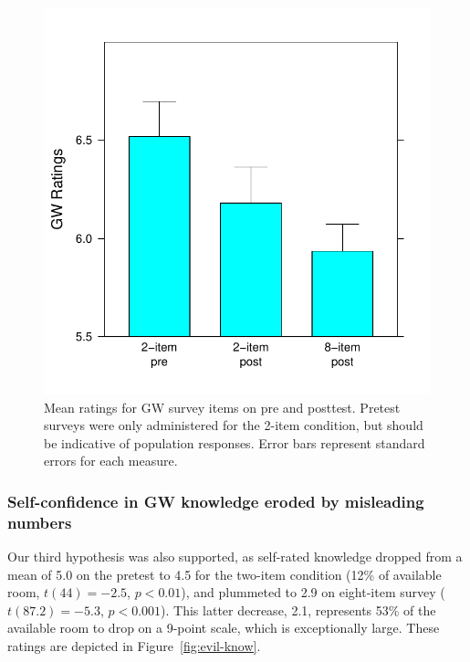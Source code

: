 \begin{figure}
    \centering
    \includegraphics{evil-GW.pdf}
    \caption{Mean ratings for GW survey items on pre and posttest. Pretest
        surveys were only administered for the 2-item condition, but should be
        indicative of population responses. Error bars represent standard errors
        for each measure.}
    \label{fig:evil-GW}
\end{figure}

\subsubsection{Self-confidence in GW knowledge eroded by misleading numbers}

Our third hypothesis was also supported, as self-rated knowledge dropped from a
mean of 5.0 on the pretest to 4.5 for the two-item condition (12\% of available
room, $t(44)=-2.5$, $p<0.01$), and plummeted to 2.9 on eight-item survey
($t(87.2)=-5.3$, $p<0.001$). This latter decrease, 2.1, represents 53\% of the
available room to drop on a 9-point scale, which is exceptionally large. These
ratings are depicted in Figure~\ref{fig:evil-know}.

